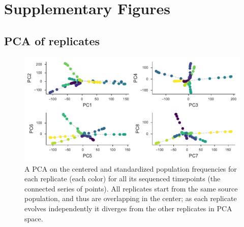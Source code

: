 \documentclass[11pt]{article}
\DeclareMathOperator{\var}{Var}
\begin{document}


\setcounter{section}{1}
\section*{Supplementary Figures}

\subsection{PCA of \textcite{Barghi2019-qy} replicates}

\begin{figure}[!ht]
  \centering

  \includegraphics[]{figures/barghi-panel-pca.pdf}

  \caption{A PCA on the centered and standardized population frequencies for
  each replicate (each color) for all its sequenced timepoints (the connected
  series of points). All replicates start from the same source population, and
  thus are overlapping in the center; as each replicate evolves independently it
  diverges from the other replicates in PCA space.}
  
  \label{suppfig:barghi-pca}
\end{figure}
\end{document}
